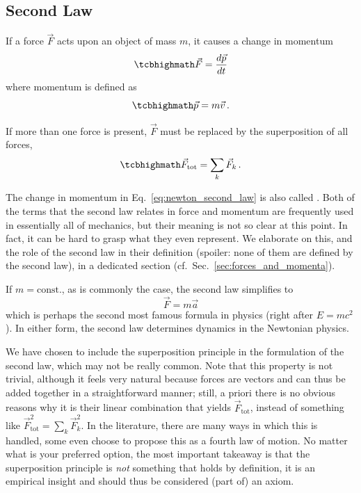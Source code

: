 \documentclass[../class_mech_main.tex]{subfiles}
\begin{document}
		\subsection{Second Law}
\begin{axiom}
	\centering
	If a force $\vec{F}$ acts upon an object of mass $m$, it causes a change in momentum
	\begin{equation}\label{eq:newton_second_law}
		\eqbox{
			\vec{F} = \dv{\vec{p}}{t}
		}
	\end{equation}
	where momentum is defined as
	\begin{equation}
		\eqbox{
			\vec{p} = m \vec{v}
		} \, .
	\end{equation}

	If more than one force is present, $\vec{F}$ must be replaced by the superposition of all forces,
	\begin{equation}
		\eqbox{
			\vec{F}_\mathrm{tot} = \sum_k \vec{F}_k
		} \, .
	\end{equation}
\end{axiom}
The change in momentum in Eq.~\eqref{eq:newton_second_law} is also called . Both of the terms that the second law relates in force and momentum are frequently used in essentially all of mechanics, but their meaning is not so clear at this point. In fact, it can be hard to grasp what they even represent. We elaborate on this, and the role of the second law in their definition (spoiler: none of them are defined by the second law), in a dedicated section (cf.~Sec.~\ref{sec:forces_and_momenta}).


If $m = \text{const.}$, as is commonly the case, the second law simplifies to
\begin{equation}
	\vec{F} = m \vec{a} %
\end{equation}
which is perhaps the second most famous formula in physics (right after $E = m c^2$). In either form, the second law determines dynamics in the Newtonian physics.


We have chosen to include the superposition principle in the formulation of the second law, which may not be really common. Note that this property is not trivial, although it feels very natural because forces are vectors and can thus be added together in a straightforward manner; still, a priori there is no obvious reasons why it is their linear combination that yields $\vec{F}_\mathrm{tot}$, instead of something like $\vec{F}_\mathrm{tot}^2 = \sum_k \vec{F}_k^2$. In the literature, there are many ways in which this is handled, some even choose to propose this as a fourth law of motion. No matter what is your preferred option, the most important takeaway is that the superposition principle is \emph{not} something that holds by definition, it is an empirical insight and should thus be considered (part of) an axiom.\\
\end{document}
